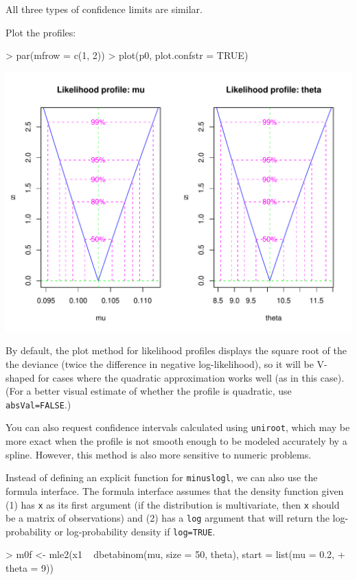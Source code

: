 \documentclass{article}
\newcommand{\code}[1]{{\tt #1}}
\begin{document}
All three types of confidence limits are similar.

Plot the profiles:
\begin{Schunk}
\begin{Sinput}
> par(mfrow = c(1, 2))
> plot(p0, plot.confstr = TRUE)
\end{Sinput}
\end{Schunk}
\includegraphics{mle2-010}

By default, the plot method for 
likelihood profiles displays the square root of the
the deviance
(twice the difference in negative
log-likelihood), so it will
be {\sf V}-shaped
for cases where the quadratic approximation works well
(as in this case).
(For a better visual estimate of whether the profile
is quadratic, use \code{absVal=FALSE}.)

You can also request confidence intervals
calculated using \code{uniroot}, which may be more exact when
the profile is not smooth enough to be modeled accurately
by a spline.  However, this method is
also more sensitive to numeric problems.

Instead of defining an
explicit function for \code{minuslogl}, 
we can also use the formula interface.
The formula interface assumes that
the density function given (1) has \code{x} as
its first argument (if the distribution is multivariate,
then \code{x} should be a matrix of observations)
and (2) has a \code{log} argument that will return
the log-probability or log-probability density
if \code{log=TRUE}.
\begin{Schunk}
\begin{Sinput}
> m0f <- mle2(x1 ~ dbetabinom(mu, size = 50, theta), start = list(mu = 0.2, 
+     theta = 9))
\end{Sinput}
\end{Schunk}
\end{document}
